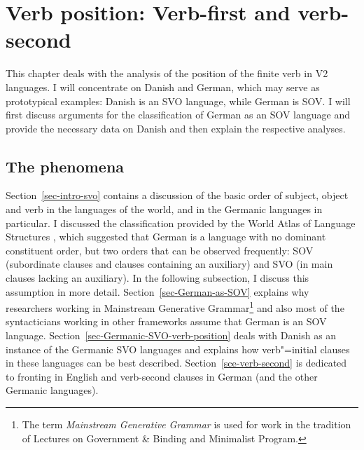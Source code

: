 \chapter{Verb position: Verb-first and verb-second}
\label{chap-verb-position}

This chapter deals with the analysis of the position of the finite verb in V2 languages. I will concentrate on
Danish and German, which may serve as prototypical examples: Danish is an SVO language, while German
is SOV. I will first discuss arguments for the classification of German as an SOV language and
provide the necessary data on Danish and then explain the respective analyses.

\section{The phenomena}

Section~\ref{sec-intro-svo} contains a discussion of the basic order of subject, object and verb in the languages
of the world, and in the Germanic languages in particular. I discussed the classification provided by
the World Atlas of Language Structures \citep{Dryer2013a}, which suggested that German is a language with no dominant
constituent order, but two orders that can be observed frequently: SOV (subordinate clauses and
clauses containing an auxiliary) and SVO (in main clauses lacking an auxiliary). 
In the following subsection, I discuss this
assumption in more detail. Section~\ref{sec-German-as-SOV} explains why researchers working in
Mainstream Generative Grammar\footnote{
  The term \emph{Mainstream Generative Grammar} is used for work in the tradition of
   Lectures on Government \& Binding and  Minimalist Program. 
} and also most of the syntacticians working in other frameworks assume
that German is an SOV language. Section~\ref{sec-Germanic-SVO-verb-position} deals with Danish as an
instance of the Germanic SVO languages and explains how verb"=initial clauses in these languages
can be best described. Section~\ref{sce-verb-second} is dedicated to fronting in English and
verb-second clauses in German (and the other Germanic languages).

